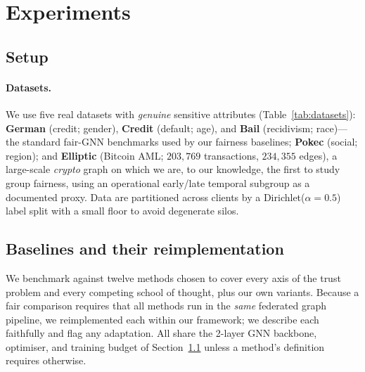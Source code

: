 \section{Experiments}
\label{sec:experiments}

\subsection{Setup}
\label{sec:setup}
\paragraph{Datasets.}
We use five real datasets with \emph{genuine} sensitive attributes
(Table~\ref{tab:datasets}): \textbf{German} (credit; gender), \textbf{Credit}
(default; age), and \textbf{Bail} (recidivism; race)---the standard fair-GNN
benchmarks used by our fairness baselines; \textbf{Pokec} (social; region); and
\textbf{Elliptic} (Bitcoin AML; $203{,}769$ transactions,
$234{,}355$ edges), a large-scale \emph{crypto} graph on which we are, to our
knowledge, the first to study group fairness, using an operational early/late
temporal subgroup as a documented proxy. Data are partitioned across clients by
a Dirichlet($\alpha{=}0.5$) label split with a small floor to avoid degenerate
silos.

\begin{table}[t]\centering\small
\caption{Datasets. $^\dagger$Elliptic uses an operational early/late temporal
subgroup as a documented proxy (not a protected demographic).}
\label{tab:datasets}

\end{table}

\subsection{Baselines and their reimplementation}
\label{sec:baselines}
We benchmark against twelve methods chosen to cover every axis of the trust
problem and every competing school of thought, plus our own variants. Because a
fair comparison requires that all methods run in the \emph{same} federated
graph pipeline, we reimplemented each within our framework; we describe each
faithfully and flag any adaptation. All share the 2-layer GNN backbone,
optimiser, and training budget of Section~\ref{sec:setup} unless a method's
definition requires otherwise.

